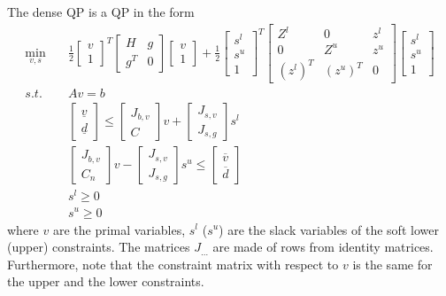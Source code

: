 \documentclass[a4paper]{report}
\begin{document}
The dense QP is a QP in the form
\begin{align*}
\min_{v,s} & \quad \frac 1 2 \begin{bmatrix} v \\ 1 \end{bmatrix}^T \begin{bmatrix} H & g \\ g^T & 0 \end{bmatrix} \begin{bmatrix} v \\ 1 \end{bmatrix} + \frac 1 2 \begin{bmatrix} s^l \\ s^u \\ 1 \end{bmatrix}^T \begin{bmatrix} Z^l & 0 & z^l \\ 0 & Z^u & z^u \\ (z^l)^T & (z^u)^T & 0 \end{bmatrix} \begin{bmatrix} s^l \\ s^u \\ 1 \end{bmatrix} \\
s.t. & \quad A v = b \\
& \quad \begin{bmatrix} \underline v \\ \underline d \end{bmatrix} \leq \begin{bmatrix} J_{b,v} \\ C \end{bmatrix} v + \begin{bmatrix} J_{s,v} \\ J_{s,g} \end{bmatrix} s^l \\
& \quad \begin{bmatrix} J_{b,v} \\ C_n \end{bmatrix} v - \begin{bmatrix} J_{s,v} \\ J_{s,g} \end{bmatrix} s^u \leq \begin{bmatrix} \overline v \\ \overline d \end{bmatrix} \\
& \quad s^l\geq 0 \\
& \quad s^u\geq 0
\end{align*}
where $v$ are the primal variables, $s^l$ ($s^u$) are the slack variables of the soft lower (upper) constraints.
The matrices $J_{\dots}$ are made of rows from identity matrices.
Furthermore, note that the constraint matrix with respect to $v$ is the same for the upper and the lower constraints.
\end{document}
